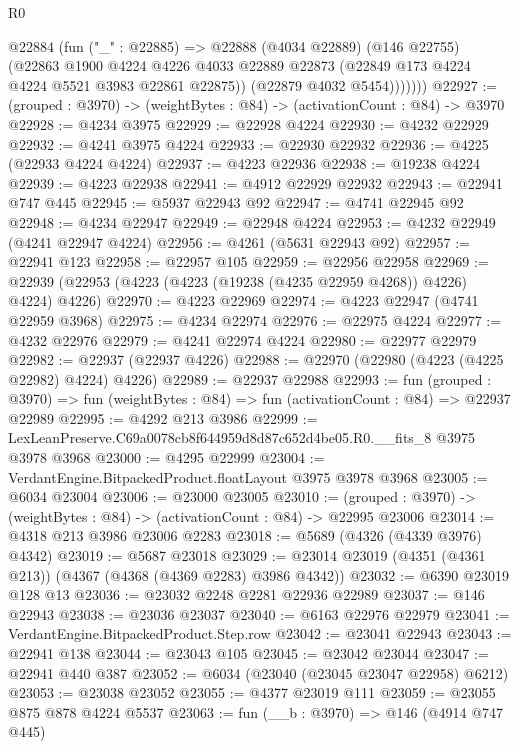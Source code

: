 \begin{lexlean}{R0}
\begin{coremodule}
            @22884
              (fun ("_" : @22885) =>
              @22888
                (@4034 @22889)
                (@146 @22755)
                (@22863
                  @1900
                  @4224
                  @4226
                  @4033
                  @22889
                  @22873
                  (@22849 @173 @4224 @4224 @5521 @3983 @22861 @22875))
                (@22879 @4032 @5454)))))))
@22927 := (grouped : @3970) -> (weightBytes : @84) -> (activationCount : @84) -> @3970
@22928 := @4234 @3975
@22929 := @22928 @4224
@22930 := @4232 @22929
@22932 := @4241 @3975 @4224
@22933 := @22930 @22932
@22936 := @4225 (@22933 @4224 @4224)
@22937 := @4223 @22936
@22938 := @19238 @4224
@22939 := @4223 @22938
@22941 := @4912 @22929 @22932
@22943 := @22941 @747 @445
@22945 := @5937 @22943 @92
@22947 := @4741 @22945 @92
@22948 := @4234 @22947
@22949 := @22948 @4224
@22953 := @4232 @22949 (@4241 @22947 @4224)
@22956 := @4261 (@5631 @22943 @92)
@22957 := @22941 @123
@22958 := @22957 @105
@22959 := @22956 @22958
@22969 := @22939 (@22953 (@4223 (@4223 (@19238 (@4235 @22959 @4268)) @4226) @4224) @4226)
@22970 := @4223 @22969
@22974 := @4223 @22947 (@4741 @22959 @3968)
@22975 := @4234 @22974
@22976 := @22975 @4224
@22977 := @4232 @22976
@22979 := @4241 @22974 @4224
@22980 := @22977 @22979
@22982 := @22937 (@22937 @4226)
@22988 := @22970 (@22980 (@4223 (@4225 @22982) @4224) @4226)
@22989 := @22937 @22988
@22993 := fun (grouped : @3970) =>
  fun (weightBytes : @84) => fun (activationCount : @84) => @22937 @22989
@22995 := @4292 @213 @3986
@22999 := LexLeanPreserve.C69a0078cb8f644959d8d87c652d4be05.R0.__fits_8 @3975 @3978 @3968
@23000 := @4295 @22999
@23004 := VerdantEngine.BitpackedProduct.floatLayout @3975 @3978 @3968
@23005 := @6034 @23004
@23006 := @23000 @23005
@23010 := (grouped : @3970) -> (weightBytes : @84) -> (activationCount : @84) -> @22995 @23006
@23014 := @4318 @213 @3986 @23006 @2283
@23018 := @5689 (@4326 (@4339 @3976) @4342)
@23019 := @5687 @23018
@23029 := @23014 @23019 (@4351 (@4361 @213)) (@4367 (@4368 (@4369 @2283) @3986 @4342))
@23032 := @6390 @23019 @128 @13
@23036 := @23032 @2248 @2281 @22936 @22989
@23037 := @146 @22943
@23038 := @23036 @23037
@23040 := @6163 @22976 @22979
@23041 := VerdantEngine.BitpackedProduct.Step.row
@23042 := @23041 @22943
@23043 := @22941 @138
@23044 := @23043 @105
@23045 := @23042 @23044
@23047 := @22941 @440 @387
@23052 := @6034 (@23040 (@23045 @23047 @22958) @6212)
@23053 := @23038 @23052
@23055 := @4377 @23019 @111
@23059 := @23055 @875 @878 @4224 @5537
@23063 := fun (__b : @3970) => @146 (@4914 @747 @445)

\end{coremodule}
\end{lexlean}
